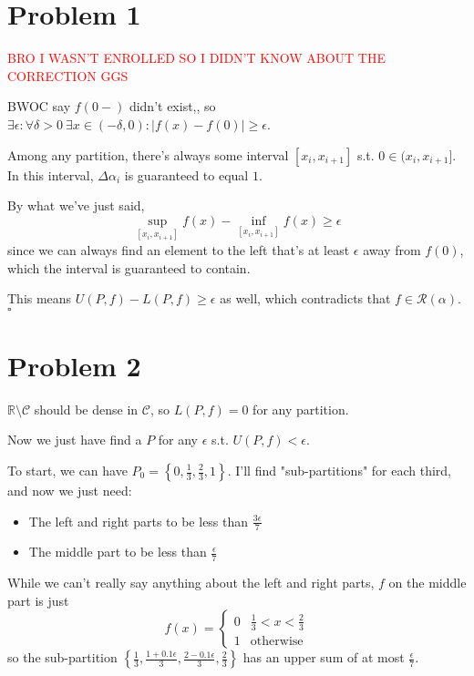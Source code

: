 \documentclass[12pt]{article}
\newcommand{\R}{\mathbb{R}}
\begin{document}
\section{Problem 1}

\textcolor{red}{BRO I WASN'T ENROLLED SO I DIDN'T KNOW ABOUT THE CORRECTION GGS}

BWOC say $f(0-)$ didn't exist,,
so $\exists \epsilon: \forall \delta > 0\ \exists x \in (-\delta, 0): |f(x)-f(0)| \ge \epsilon$.

Among any partition, there's always some interval $[x_i, x_{i+1}]$ s.t. $0 \in (x_i, x_{i+1}]$.
In this interval, $\Delta \alpha_i$ is guaranteed to equal $1$.

By what we've just said,
\[\sup_{[x_i, x_{i+1}]} f(x)-\inf_{[x_i, x_{i+1}]} f(x) \ge \epsilon\]
since we can always find an element to the left that's at least $\epsilon$ away from $f(0)$,
which the interval is guaranteed to contain.

This means $U(P, f) - L(P, f) \ge \epsilon$ as well,
which contradicts that $f \in \mathcal{R}(\alpha)$. $\square$

\section{Problem 2}

$\R \setminus \mathcal{C}$ should be dense in $\mathcal{C}$, so $L(P, f)=0$ for any partition.

Now we just have find a $P$ for any $\epsilon$ s.t. $U(P, f) < \epsilon$.

To start, we can have $P_0=\left\{0, \frac{1}{3}, \frac{2}{3}, 1\right\}$.
I'll find "sub-partitions" for each third, and now we just need:
\begin{itemize}
  \item The left and right parts to be less than $\frac{3\epsilon}{7}$
  \item The middle part to be less than $\frac{\epsilon}{7}$
\end{itemize}

While we can't really say anything about the left and right parts, $f$ on the middle part is just
\[f(x)=\begin{cases}
    0 & \frac{1}{3} < x < \frac{2}{3} \\
    1 & \text{otherwise}
  \end{cases}\]
so the sub-partition $\left\{\frac{1}{3}, \frac{1+0.1\epsilon}{3}, \frac{2-0.1\epsilon}{3}, \frac{2}{3}\right\}$
has an upper sum of at most $\frac{\epsilon}{7}$.
\end{document}
